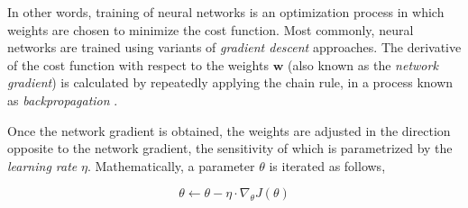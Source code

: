 \begin{table}[]
    \centering
    \caption{Common loss functions.}
    \label{tab:loss_fcns}
\end{table}

In other words, training of neural networks is an optimization process in which weights are chosen to minimize the cost function. Most commonly, neural networks are trained using variants of \emph{gradient descent} approaches. The derivative of the cost function with respect to the weights $\mathbf{w}$ (also known as the \emph{network gradient}) is calculated by repeatedly applying the chain rule, in a process known as \emph{backpropagation} \cite{rumelhart_backprop}.


Once the network gradient is obtained, the weights are adjusted in the direction opposite to the network gradient, the sensitivity of which is parametrized by the \emph{learning rate} $\eta$. Mathematically, a parameter $\theta$ is iterated as follows, 

\begin{equation}
    \label{eqn:lr}
    \theta \leftarrow \theta - \eta \cdot \nabla_\theta J(\theta) 
\end{equation}

